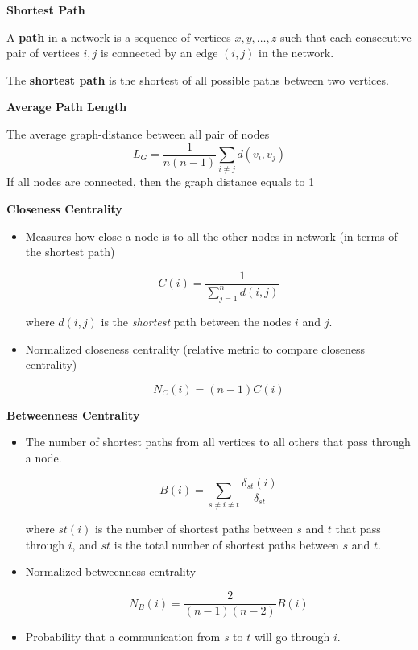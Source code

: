 \textbf{Shortest Path}

A \textbf{path} in a network is a sequence of vertices $x,y,\dotsc,z$ such that each consecutive pair of vertices $i,j$ is connected by an edge $(i,j)$ in the network.

The \textbf{shortest path} is the shortest of all possible paths between two vertices.

\textbf{Average Path Length}

The average graph-distance between all pair of nodes
\begin{equation*}
    L_{G} =\frac{1}{n(n-1)}\sum _{i\neq j} d(v_{i},v_{j})
\end{equation*}
If all nodes are connected, then the graph distance equals to 1

\textbf{Closeness Centrality}
\begin{itemize}
    \item Measures how close a node is to all the other nodes in network (in terms of the shortest path)
          
          \begin{equation*}
              \boxed{C(i)=\frac{1}{\sum _{j=1}^{n} d(i,j)}}
          \end{equation*}
          
          where $d(i,j)$ is the \textit{shortest} path between the nodes $i$ and $j$.
    \item Normalized closeness centrality (relative metric to compare closeness centrality)
          
          \begin{equation*}
              \boxed{N_{C} (i)=(n-1)C(i)}
          \end{equation*}
\end{itemize}

\textbf{Betweenness Centrality}
\begin{itemize}
    \item The number of shortest paths from all vertices to all others that pass through a node.
          
          \begin{equation*}
              \boxed{B(i)=\sum _{s\neq i\neq t}\frac{\delta _{st} (i)}{\delta _{st}}}
          \end{equation*}
          
          where $st\left(i\right)$ is the number of shortest paths between $s$ and $t$ that pass through $i$, and $st$ is the total number of shortest paths between $s$ and $t$.
    \item Normalized betweenness centrality
          
          \begin{equation*}
              N_{B} (i)=\frac{2}{(n-1)(n-2)} B(i)
          \end{equation*}
    \item Probability that a communication from $s$ to $t$ will go through $i$.
\end{itemize}

